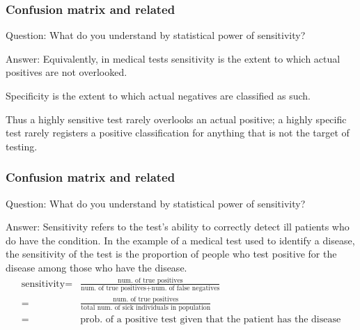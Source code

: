 \documentclass[11pt]{beamer}
\begin{document}
\begin{frame}
\frametitle{Confusion matrix and related}
\begin{block}{Question:}
	What do you understand by statistical power of sensitivity?
\end{block}
\begin{block}{Answer:}
	Equivalently, in medical tests sensitivity is the extent to which actual positives are not overlooked.
	
	Specificity is the extent to which actual negatives are classified as such.
	
	Thus a highly sensitive test rarely overlooks an actual positive; a highly specific test rarely registers a positive classification for anything that is not the target of testing.
\end{block}
\end{frame}

\begin{frame}
\frametitle{Confusion matrix and related}
\begin{block}{Question:}
	What do you understand by statistical power of sensitivity?
\end{block}
\begin{block}{Answer:}
	Sensitivity refers to the test's ability to correctly detect ill patients who do have the condition. In the example of a medical test used to identify a disease, the sensitivity of the test is the proportion of people who test positive for the disease among those who have the disease.
	\begin{align*}
		\text{sensitivity}=&\frac{\text{num. of true positives}}{\text{num. of true positives} +\text{num. of false negatives}}\\
		=&\frac{\text{num. of true positives}}{\text{total num. of sick individuals in population}}\\
		=& \text{prob. of a positive test given that the patient has the disease}
	\end{align*}

\end{block}
\end{frame}
\end{document}
